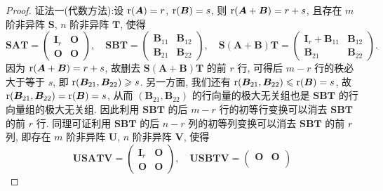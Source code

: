 \documentclass[../../main.tex]{subfiles}%
\begin{document}
\begin{proof}

{\color{blue}证法一(代数方法):}设 ${\rm r}(\boldsymbol{A}) = r$, ${\rm r}(\boldsymbol{B}) = s$, 则 ${\rm r}(\boldsymbol{A} + \boldsymbol{B}) = r + s$, 且存在 $m$ 阶非异阵 $\boldsymbol{S}$, $n$ 阶非异阵 $\boldsymbol{T}$, 使得
$$
\boldsymbol{S}\boldsymbol{A}\boldsymbol{T} = \begin{pmatrix}
\boldsymbol{I}_r & \boldsymbol{O} \\
\boldsymbol{O} & \boldsymbol{O}
\end{pmatrix}, \quad \boldsymbol{S}\boldsymbol{B}\boldsymbol{T} = \begin{pmatrix}
\boldsymbol{B}_{11} & \boldsymbol{B}_{12} \\
\boldsymbol{B}_{21} & \boldsymbol{B}_{22}
\end{pmatrix}, \quad \boldsymbol{S}(\boldsymbol{A} + \boldsymbol{B})\boldsymbol{T} = \begin{pmatrix}
\boldsymbol{I}_r + \boldsymbol{B}_{11} & \boldsymbol{B}_{12} \\
\boldsymbol{B}_{21} & \boldsymbol{B}_{22}
\end{pmatrix}.
$$
因为 ${\rm r}(\boldsymbol{A} + \boldsymbol{B}) = r + s$, 故删去 $\boldsymbol{S}(\boldsymbol{A} + \boldsymbol{B})\boldsymbol{T}$ 的前 $r$ 行, 可得后 $m - r$ 行的秩必大于等于 $s$, 即 ${\rm r}(\boldsymbol{B}_{21}, \boldsymbol{B}_{22}) \geqslant s$. 另一方面, 我们还有 ${\rm r}(\boldsymbol{B}_{21}, \boldsymbol{B}_{22}) \leqslant {\rm r}(\boldsymbol{B}) = s$, 故 ${\rm r}(\boldsymbol{B}_{21}, \boldsymbol{B}_{22}) = {\rm r}(\boldsymbol{B}) = s$, 从而 $(\boldsymbol{B}_{21}, \boldsymbol{B}_{22})$ 的行向量的极大无关组也是 $\boldsymbol{S}\boldsymbol{B}\boldsymbol{T}$ 的行向量组的极大无关组. 因此利用 $\boldsymbol{S}\boldsymbol{B}\boldsymbol{T}$ 的后 $m - r$ 行的初等行变换可以消去 $\boldsymbol{S}\boldsymbol{B}\boldsymbol{T}$ 的前 $r$ 行. 同理可证利用 $\boldsymbol{S}\boldsymbol{B}\boldsymbol{T}$ 的后 $n - r$ 列的初等列变换可以消去 $\boldsymbol{S}\boldsymbol{B}\boldsymbol{T}$ 的前 $r$ 列, 即存在 $m$ 阶非异阵 $\boldsymbol{U}$, $n$ 阶非异阵 $\boldsymbol{V}$, 使得
$$
\boldsymbol{U}\boldsymbol{S}\boldsymbol{A}\boldsymbol{T}\boldsymbol{V} = \begin{pmatrix}
\boldsymbol{I}_r & \boldsymbol{O} \\
\boldsymbol{O} & \boldsymbol{O}
\end{pmatrix}, \quad \boldsymbol{U}\boldsymbol{S}\boldsymbol{B}\boldsymbol{T}\boldsymbol{V} = \begin{pmatrix}
\boldsymbol{O} & \boldsymbol{O} \\

\end{pmatrix}$$
\end{proof}
\end{document}
